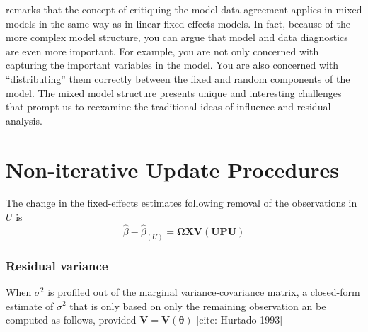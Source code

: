 \documentclass[12pt, a4paper]{report}
\theoremstyle{plain}
\theoremstyle{definition}
\theoremstyle{remark}
\begin{document}
\citet{schab} remarks that the concept of critiquing the model-data agreement applies in mixed models in the same way as in linear
fixed-effects models. In fact, because of the more complex model structure, you can argue that model and
data diagnostics are even more important. For example, you are not only concerned with capturing the
important variables in the model. You are also concerned with ``distributing” them correctly between the
fixed and random components of the model. The mixed model structure presents unique and interesting
challenges that prompt us to reexamine the traditional ideas of influence and residual analysis.

%	
%	
\section{Non-iterative Update Procedures}


The change in the fixed-effects estimates following removal of the observations in $U$ is
\[ \hat{\beta} - \hat{\beta}_{(U)} = \boldsymbol{\Omega}\boldsymbol{X}\boldsymbol{V}
\left( \boldsymbol{U} \boldsymbol{P}\boldsymbol{U}\right)   \]
\subsubsection{Residual variance}
When $\sigma^2$ is profiled out of the marginal variance-covariance matrix, a closed-form estimate of $\sigma^2$ that is only based on only the remaining observation
an be computed as follows, provided $\boldsymbol{V} = \boldsymbol{V}(\boldsymbol{\theta}) $
[cite: Hurtado 1993]
\end{document}
